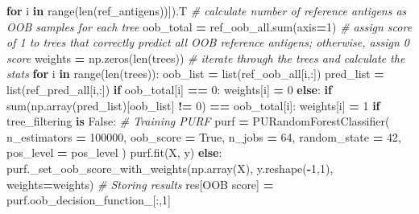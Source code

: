 \documentclass[
  11pt,
  oneside]{book}
\newenvironment{Shaded}{\begin{snugshade}}{\end{snugshade}}
\newcommand{\BuiltInTok}[1]{#1}
\newcommand{\CommentTok}[1]{\textcolor[rgb]{0.56,0.35,0.01}{\textit{#1}}}
\newcommand{\ControlFlowTok}[1]{\textcolor[rgb]{0.13,0.29,0.53}{\textbf{#1}}}
\newcommand{\DecValTok}[1]{\textcolor[rgb]{0.00,0.00,0.81}{#1}}
\newcommand{\KeywordTok}[1]{\textcolor[rgb]{0.13,0.29,0.53}{\textbf{#1}}}
\newcommand{\NormalTok}[1]{#1}
\newcommand{\OperatorTok}[1]{\textcolor[rgb]{0.81,0.36,0.00}{\textbf{#1}}}
\newcommand{\StringTok}[1]{\textcolor[rgb]{0.31,0.60,0.02}{#1}}
\newcommand{\VariableTok}[1]{\textcolor[rgb]{0.00,0.00,0.00}{#1}}
\begin{document}
\begin{Shaded}
\begin{Highlighting}[]
                                 \ControlFlowTok{for}\NormalTok{ i }\KeywordTok{in} \BuiltInTok{range}\NormalTok{(}\BuiltInTok{len}\NormalTok{(ref\_antigens))]).T}
        \CommentTok{\# calculate number of reference antigens as OOB samples for each tree}
\NormalTok{        oob\_total }\OperatorTok{=}\NormalTok{ ref\_oob\_all.}\BuiltInTok{sum}\NormalTok{(axis}\OperatorTok{=}\DecValTok{1}\NormalTok{)}
        \CommentTok{\# assign score of 1 to trees that correctly predict all OOB reference antigens; otherwise, assign 0 score }
\NormalTok{        weights }\OperatorTok{=}\NormalTok{ np.zeros(}\BuiltInTok{len}\NormalTok{(trees))}
        \CommentTok{\# iterate through the trees and calculate the stats}
        \ControlFlowTok{for}\NormalTok{ i }\KeywordTok{in} \BuiltInTok{range}\NormalTok{(}\BuiltInTok{len}\NormalTok{(trees)):}
\NormalTok{            oob\_list }\OperatorTok{=} \BuiltInTok{list}\NormalTok{(ref\_oob\_all[i,:])}
\NormalTok{            pred\_list }\OperatorTok{=} \BuiltInTok{list}\NormalTok{(ref\_pred\_all[i,:])}
            \ControlFlowTok{if}\NormalTok{ oob\_total[i] }\OperatorTok{==} \DecValTok{0}\NormalTok{:}
\NormalTok{                weights[i] }\OperatorTok{=} \DecValTok{0}
            \ControlFlowTok{else}\NormalTok{:}
                \ControlFlowTok{if} \BuiltInTok{sum}\NormalTok{(np.array(pred\_list)[oob\_list] }\OperatorTok{!=} \DecValTok{0}\NormalTok{) }\OperatorTok{==}\NormalTok{ oob\_total[i]:}
\NormalTok{                    weights[i] }\OperatorTok{=} \DecValTok{1}
    \ControlFlowTok{if}\NormalTok{ tree\_filtering }\KeywordTok{is} \VariableTok{False}\NormalTok{:}
        \CommentTok{\# Training PURF}
\NormalTok{        purf }\OperatorTok{=}\NormalTok{ PURandomForestClassifier(}
\NormalTok{            n\_estimators }\OperatorTok{=} \DecValTok{100000}\NormalTok{,}
\NormalTok{            oob\_score }\OperatorTok{=} \VariableTok{True}\NormalTok{,}
\NormalTok{            n\_jobs }\OperatorTok{=} \DecValTok{64}\NormalTok{,}
\NormalTok{            random\_state }\OperatorTok{=} \DecValTok{42}\NormalTok{,}
\NormalTok{            pos\_level }\OperatorTok{=}\NormalTok{ pos\_level}
\NormalTok{        )}
\NormalTok{        purf.fit(X, y)}
    \ControlFlowTok{else}\NormalTok{:}
\NormalTok{        purf.\_set\_oob\_score\_with\_weights(np.array(X), y.reshape(}\OperatorTok{{-}}\DecValTok{1}\NormalTok{,}\DecValTok{1}\NormalTok{), weights}\OperatorTok{=}\NormalTok{weights)}
    \CommentTok{\# Storing results}
\NormalTok{    res[}\StringTok{\textquotesingle{}OOB score\textquotesingle{}}\NormalTok{] }\OperatorTok{=}\NormalTok{ purf.oob\_decision\_function\_[:,}\DecValTok{1}\NormalTok{]}

\end{Highlighting}
\end{Shaded}
\end{document}
